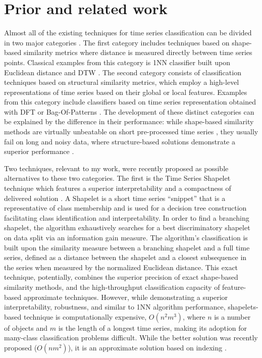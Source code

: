 \section{Prior and related work} \label{sax_vsm_prior}
Almost all of the existing techniques for time series classification can be divided in two major categories \cite{citeulike:11796594}. 
The first category includes techniques based on shape-based similarity metrics where distance is measured directly between time 
series points. Classical examples from this category is 1NN classifier built upon Euclidean distance \cite{citeulike:4214336} and 
DTW \cite{citeulike:3496861}. The second category consists of classification techniques based on structural similarity metrics, 
which employ a high-level representations of time series based on their global or local features. 
Examples from this category include classifiers based on time series representation obtained with DFT \cite{citeulike:5094223} or 
Bag-Of-Patterns \cite{citeulike:10525778}. 
The development of these distinct categories can be explained by the difference in their performance: 
while shape-based similarity methods are virtually unbeatable on short pre-processed time series \cite{citeulike:532340}, 
they usually fail on long and noisy data, where structure-based solutions demonstrate a superior performance \cite{citeulike:10525778}. 

Two techniques, relevant to my work, were recently proposed as possible alternatives to these two categories.
The first is the Time Series Shapelet technique which features a superior interpretability and a compactness of delivered solution 
\cite{citeulike:7344347}. A Shapelet is a short time series ``snippet'' that is a representative of class
membership and is used for a decision tree construction facilitating class identification and interpretability.
In order to find a branching shapelet, the algorithm exhaustively searches for a best discriminatory shapelet on data split 
via an information gain measure. The algorithm's classification is built upon the similarity measure between a branching 
shapelet and a full time series, defined as a distance between the shapelet and a closest subsequence in the series 
when measured by the normalized Euclidean distance. This exact technique, potentially, combines the superior precision of 
exact shape-based similarity methods, and the high-throughput classification capacity of feature-based approximate techniques. 
However, while demonstrating a superior interpretability, robustness, and similar to 1NN algorithm performance, shapelets-based 
technique is computationally expensive, $O(n^{2}m^{3})$, where $n$ is a number of objects and $m$ is the length of a longest 
time series, making its adoption for many-class classification problems difficult\cite{citeulike:11345338}. 
While the better solution was recently proposed ($O(nm^{2})$), it is an approximate solution based on indexing \cite{citeulike:12563493}.

